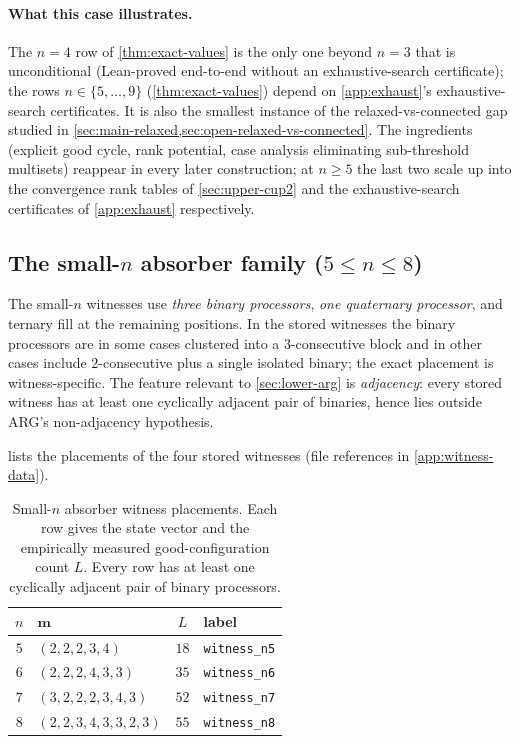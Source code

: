 \documentclass[11pt,a4paper]{article}
\theoremstyle{plain}
\theoremstyle{definition}
\begin{document}
\paragraph{What this case illustrates.} The $n = 4$ row of
\cref{thm:exact-values} is the only one beyond $n = 3$ that is
unconditional (Lean-proved end-to-end without an
exhaustive-search certificate); the rows
$n \in \{5, \ldots, 9\}$ (\cref{thm:exact-values}) depend
on \cref{app:exhaust}'s exhaustive-search certificates.  It is also
the smallest instance of the
relaxed-vs-connected gap studied in
\cref{sec:main-relaxed,sec:open-relaxed-vs-connected}.  The
ingredients (explicit good cycle, rank potential, case analysis
eliminating sub-threshold multisets) reappear in every later
construction; at $n \ge 5$ the last two scale up into the
convergence rank tables of \cref{sec:upper-cup2} and the
exhaustive-search certificates of \cref{app:exhaust} respectively.

\subsection{The small-$n$ absorber family ($5 \le n \le 8$)}\label{sec:upper-small}

The small-$n$ witnesses use \emph{three binary processors}, \emph{one
quaternary processor}, and ternary fill at the remaining positions.
In the stored witnesses the binary processors are in some cases
clustered into a $3$-consecutive block and in other cases include
$2$-consecutive plus a single isolated binary; the exact placement is
witness-specific.  The feature relevant to \cref{sec:lower-arg} is
\emph{adjacency}: every stored witness has at least one cyclically
adjacent pair of binaries, hence lies outside ARG's non-adjacency
hypothesis.

 lists the placements of the four stored
witnesses (file references in \cref{app:witness-data}).

\begin{table}[ht]
\centering
\caption{Small-$n$ absorber witness placements.  Each row gives the
state vector and the empirically measured good-configuration count $L$.
Every row has at least one cyclically adjacent pair of binary
processors.}\label{tab:small-witnesses}
\begin{tabular}{c l c l}
\toprule
$n$ & $\mathbf{m}$ & $L$ & label\\\midrule
$5$ & $(2, 2, 2, 3, 4)$              & $18$ & \texttt{witness\_n5}\\
$6$ & $(2, 2, 2, 4, 3, 3)$           & $35$ & \texttt{witness\_n6}\\
$7$ & $(3, 2, 2, 2, 3, 4, 3)$        & $52$ & \texttt{witness\_n7}\\
$8$ & $(2, 2, 3, 4, 3, 3, 2, 3)$     & $55$ & \texttt{witness\_n8}\\
\bottomrule
\end{tabular}
\end{table}
\end{document}
